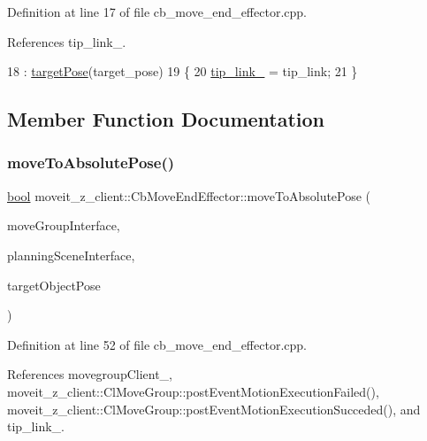 Definition at line 17 of file cb\+\_\+move\+\_\+end\+\_\+effector.\+cpp.



References tip\+\_\+link\+\_\+.


\begin{DoxyCode}
18     : \hyperlink{classmoveit__z__client_1_1CbMoveEndEffector_abea9c6077733077baced34c6098c6140}{targetPose}(target\_pose)
19 \{
20     \hyperlink{classmoveit__z__client_1_1CbMoveEndEffector_abd92e9d3d67bdde11f9e38e0b44a2b8b}{tip\_link\_} = tip\_link;
21 \}
\end{DoxyCode}


\subsection{Member Function Documentation}
\mbox{\label{classmoveit__z__client_1_1CbMoveEndEffector_a4b77954562c23ba6d0aa0f9c805dfd8d}} 
\subsubsection{\texorpdfstring{move\+To\+Absolute\+Pose()}{moveToAbsolutePose()}}
{\footnotesize\ttfamily \hyperlink{classbool}{bool} moveit\+\_\+z\+\_\+client\+::\+Cb\+Move\+End\+Effector\+::move\+To\+Absolute\+Pose (\begin{DoxyParamCaption}\item[{moveit\+::planning\+\_\+interface\+::\+Move\+Group\+Interface \&}]{move\+Group\+Interface,  }\item[{moveit\+::planning\+\_\+interface\+::\+Planning\+Scene\+Interface \&}]{planning\+Scene\+Interface,  }\item[{geometry\+\_\+msgs\+::\+Pose\+Stamped \&}]{target\+Object\+Pose }\end{DoxyParamCaption})\hspace{0.3cm}{\ttfamily [private]}}



Definition at line 52 of file cb\+\_\+move\+\_\+end\+\_\+effector.\+cpp.



References movegroup\+Client\+\_\+, moveit\+\_\+z\+\_\+client\+::\+Cl\+Move\+Group\+::post\+Event\+Motion\+Execution\+Failed(), moveit\+\_\+z\+\_\+client\+::\+Cl\+Move\+Group\+::post\+Event\+Motion\+Execution\+Succeded(), and tip\+\_\+link\+\_\+.



